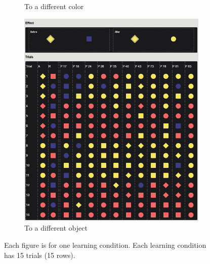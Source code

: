 \documentclass{article}
\begin{document}
\begin{figure}[h!]
\begin{subfigure}[t]{0.32\textwidth}
  	\caption{To a different color} \label{fig:learn04}
  \end{subfigure}
  \hfill
  \begin{subfigure}[t]{0.32\textwidth}
  	\centering
  	\includegraphics[width=\linewidth]{learn05} 
  	\caption{To a different object} \label{fig:learn05}
  \end{subfigure}
  \caption{Each figure is for one learning condition. 
  Each learning condition has 15 trials (15 rows).}
\end{figure}
\end{document}
